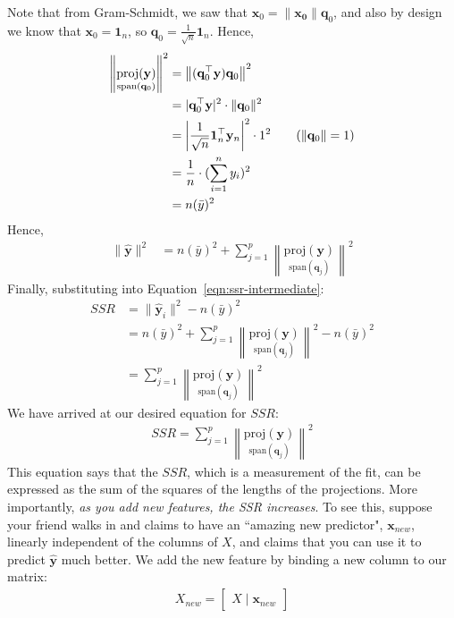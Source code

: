 \documentclass[12pt, a4paper]{article}
\theoremstyle{definition}
\begin{document}
	Note that from Gram-Schmidt, we saw that $\mathbf{x}_0=\mathbf{\|\mathbf{x}_0}\|\mathbf{q}_0$,
	and also by design we know that $\mathbf{x}_0=\mathbf{1}_n$, so
	$\mathbf{q}_0=\frac{1}{\sqrt{n}}\mathbf{1}_n$. Hence,
	\begin{align*}
		\left\|\underset{\text{span}(\mathbf{q}_0)}{\text{proj}(\mathbf{y})}\right\|^2
		&=\left\|(\mathbf{q}_0^\top\mathbf{y})\mathbf{q}_0\right\|^2\\
		&=|\mathbf{q}_0^\top \mathbf{y}|^2\cdot \|\mathbf{q}_0\|^2\\
		&=\left| \frac{1}{\sqrt{n}}\mathbf{1}_n^\top \mathbf{y}_n\right|^2\cdot 1^2
		\tag{$\|\mathbf{q}_0\|=1$}\\
		&=\frac{1}{n}\cdot (\sum_{i=1}^{n}y_i)^2\\
		&=n(\bar{y})^2
	\end{align*}
	Hence,
	\begin{align}
		\|\mathbf{\hat{y}}\|^2 &= n(\bar{y})^2
		+\sum_{j=1}^{p}\left\|
		\underset{\text{span}(\mathbf{q}_j)}{\text{proj}(\mathbf{y})}
		\right\|^2
		\label{eqn:norm-yhat}
	\end{align}
	Finally, substituting into Equation~\ref{eqn:ssr-intermediate}:
	\begin{align*}
		SSR &= \|\mathbf{\hat{y}}_i\|^2 - n(\bar{y})^2\\
		&=n(\bar{y})^2
		+\sum_{j=1}^{p}\left\|
		\underset{\text{span}(\mathbf{q}_j)}{\text{proj}(\mathbf{y})}
		\right\|^2
		- n(\bar{y})^2\\
		&=\sum_{j=1}^{p}\left\|
		\underset{\text{span}(\mathbf{q}_j)}{\text{proj}(\mathbf{y})}
		\right\|^2
	\end{align*}
	We have arrived at our desired equation for $SSR$:
	\begin{align}
		SSR =\sum_{j=1}^{p}\left\|
		\underset{\text{span}(\mathbf{q}_j)}{\text{proj}(\mathbf{y})}
		\right\|^2
		\label{eqn:ssr-sum-of-projs}
	\end{align}
	This equation says that the $SSR$, which is a measurement of the fit, can be
	expressed as the sum of the squares of the lengths of the projections.
	More importantly, \textit{as you add new features, the SSR increases}.
	To see this,
	suppose your friend walks in and claims to have an ``amazing new predictor",
	$\mathbf{x}_{new}$, linearly independent of the columns of $X$, and claims that
	you can use it to predict $\mathbf{\hat{y}}$ much better. We add the new feature by
	binding a new column to our matrix:
	\begin{align*}
		X_{new}=\begin{bmatrix}
			X \mid \mathbf{x}_{new}
		\end{bmatrix}
	\end{align*}
\end{document}
